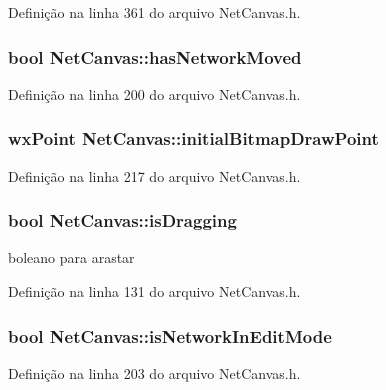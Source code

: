 Definição na linha 361 do arquivo Net\+Canvas.\+h.

\subsubsection[{has\+Network\+Moved}]{\setlength{\rightskip}{0pt plus 5cm}bool Net\+Canvas\+::has\+Network\+Moved}\label{class_net_canvas_aec7180ca19b119642c8c7879ded84e99}


Definição na linha 200 do arquivo Net\+Canvas.\+h.

\subsubsection[{initial\+Bitmap\+Draw\+Point}]{\setlength{\rightskip}{0pt plus 5cm}wx\+Point Net\+Canvas\+::initial\+Bitmap\+Draw\+Point}\label{class_net_canvas_aab94d6cc55c7bfcff6cf5cc69d971fa0}


Definição na linha 217 do arquivo Net\+Canvas.\+h.

\subsubsection[{is\+Dragging}]{\setlength{\rightskip}{0pt plus 5cm}bool Net\+Canvas\+::is\+Dragging}\label{class_net_canvas_acd4e1a6871a35fd5f7bc3cc7d16071e4}
boleano para arastar 

Definição na linha 131 do arquivo Net\+Canvas.\+h.

\subsubsection[{is\+Network\+In\+Edit\+Mode}]{\setlength{\rightskip}{0pt plus 5cm}bool Net\+Canvas\+::is\+Network\+In\+Edit\+Mode}\label{class_net_canvas_a33197bcaaa14a77fdf6b0244514479e5}


Definição na linha 203 do arquivo Net\+Canvas.\+h.

